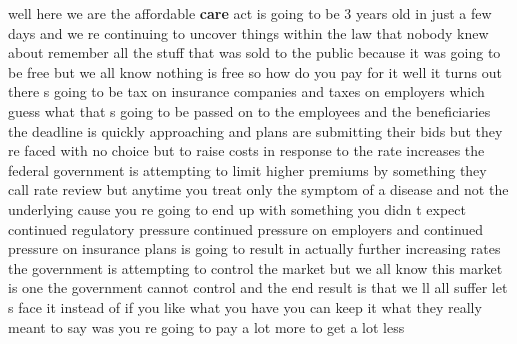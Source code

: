 \documentclass{article}
\begin{document}
\vspace{8mm}
well here we are the affordable {\bf \color{red} care} act is going to be 3 years old in just a few days and we re continuing to uncover things within the law that nobody knew about remember all the stuff that was sold to the public because it was going to be free but we all know nothing is free so how do you pay for it well it turns out there s going to be tax on insurance companies and taxes on employers which guess what that s going to be passed on to the employees and the beneficiaries the deadline is quickly approaching and plans are submitting their bids but they re faced with no choice but to raise costs in response to the rate increases the federal government is attempting to limit higher premiums by something they call rate review but anytime you treat only the symptom of a disease and not the underlying cause you re going to end up with something you didn t expect continued regulatory pressure continued pressure on employers and continued pressure on insurance plans is going to result in actually further increasing rates the government is attempting to control the market but we all know this market is one the government cannot control and the end result is that we ll all suffer let s face it instead of if you like what you have you can keep it what they really meant to say was you re going to pay a lot more to get a lot less\pagebreak
\end{document}
